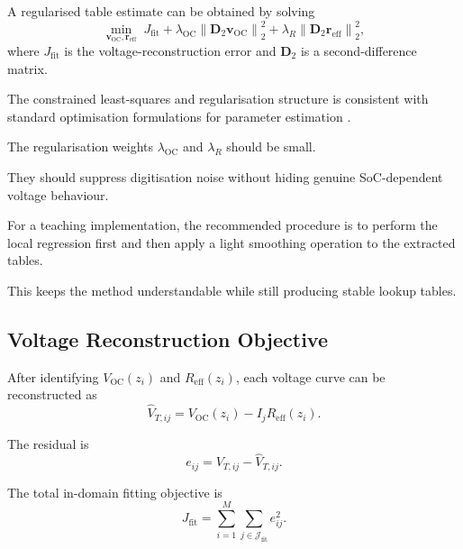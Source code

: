 \documentclass[a4paper,12pt]{article}
\newcommand{\mat}[1]{\mathbf{#1}}
\newcommand{\vect}[1]{\bm{#1}}
\begin{document}
A regularised table estimate can be obtained by solving
\begin{equation}
\min_{\vect{v}_{\mathrm{OC}},\vect{r}_{\mathrm{eff}}}
\;
J_{\mathrm{fit}}
+
\lambda_{\mathrm{OC}}
\left\|
\mat{D}_2\vect{v}_{\mathrm{OC}}
\right\|_2^2
+
\lambda_R
\left\|
\mat{D}_2\vect{r}_{\mathrm{eff}}
\right\|_2^2,
\label{eq:method_regularised_static_fit}
\end{equation}
where \(J_{\mathrm{fit}}\) is the voltage-reconstruction error and \(\mat{D}_2\) is a second-difference matrix.

The constrained least-squares and regularisation structure is consistent with standard optimisation formulations for parameter estimation \cite{boyd_vandenberghe_convex,nocedal_wright_numerical}.

The regularisation weights \(\lambda_{\mathrm{OC}}\) and \(\lambda_R\) should be small.

They should suppress digitisation noise without hiding genuine SoC-dependent voltage behaviour.

For a teaching implementation, the recommended procedure is to perform the local regression first and then apply a light smoothing operation to the extracted tables.

This keeps the method understandable while still producing stable lookup tables.

\subsection{Voltage Reconstruction Objective}

After identifying \(V_{\mathrm{OC}}(z_i)\) and \(R_{\mathrm{eff}}(z_i)\), each voltage curve can be reconstructed as
\begin{equation}
\hat{V}_{T,ij}
=
V_{\mathrm{OC}}(z_i)
-
I_jR_{\mathrm{eff}}(z_i).
\label{eq:method_voltage_reconstruction}
\end{equation}

The residual is
\begin{equation}
e_{ij}
=
V_{T,ij}
-
\hat{V}_{T,ij}.
\label{eq:method_voltage_residual}
\end{equation}

The total in-domain fitting objective is
\begin{equation}
J_{\mathrm{fit}}
=
\sum_{i=1}^{M}
\sum_{j\in\mathcal{J}_{\mathrm{fit}}}
e_{ij}^{2}.
\label{eq:method_total_fit_objective}
\end{equation}
\end{document}
